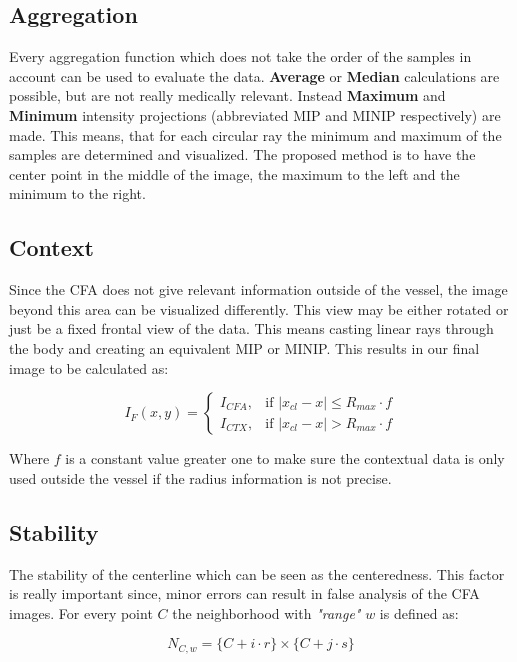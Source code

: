 \subsection{Aggregation}
Every aggregation function which does not take the order of the samples in account can be used to evaluate the data. \textbf{Average} or \textbf{Median} calculations are possible, but are not really medically relevant. Instead \textbf{Maximum} and \textbf{Minimum} intensity projections (abbreviated MIP and MINIP respectively) are made. This means, that for each circular ray the minimum and maximum of the samples are determined and visualized. The proposed method is to have the center point in the middle of the image, the maximum to the left and the  minimum to the right.

\subsection{Context}
Since the CFA does not give relevant information outside of the vessel, the image beyond this area can be visualized differently. This view may be either rotated or just be a fixed frontal view of the data. This means casting linear rays through the body and creating an equivalent MIP or MINIP. This results in our final image to be calculated as:

\begin{equation}
I_F(x,y)= 
\begin{cases}
I_{CFA},& \text{if } |x_{cl} - x | \le R_{max} \cdot f \\
I_{CTX},& \text{if } |x_{cl} - x | > R_{max} \cdot f
\end{cases}
\end{equation}

Where $f$ is a constant value greater one to make sure the contextual data is only used outside the vessel if the radius information is not precise.

\subsection{Stability}

The stability of the centerline which can be seen as the centeredness. This factor is really important since, minor errors can result in false analysis of the CFA images. For every point $C$ the neighborhood with \textit{"range"} $w$ is defined as:

\begin{equation}
N_{C,w} = \{C + i \cdot r\} \times \{C + j \cdot s\}
\end{equation}

